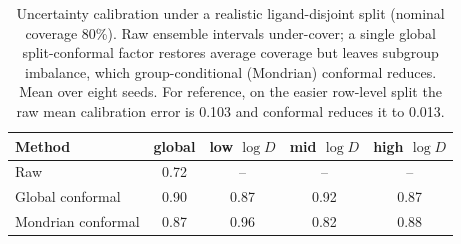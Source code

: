 \begin{table}[htbp]
\centering
\caption{Uncertainty calibration under a realistic ligand-disjoint split (nominal coverage 80\%). Raw ensemble intervals under-cover; a single global split-conformal factor restores average coverage but leaves subgroup imbalance, which group-conditional (Mondrian) conformal reduces. Mean over eight seeds. For reference, on the easier row-level split the raw mean calibration error is 0.103 and conformal reduces it to 0.013.}
\label{tab:calib}
\begin{tabular}{lcccc}
\toprule
Method & global & low $\log D$ & mid $\log D$ & high $\log D$ \\
\midrule
Raw & 0.72 & -- & -- & -- \\
Global conformal & 0.90 & 0.87 & 0.92 & 0.87 \\
Mondrian conformal & 0.87 & 0.96 & 0.82 & 0.88 \\
\bottomrule
\end{tabular}
\end{table}
